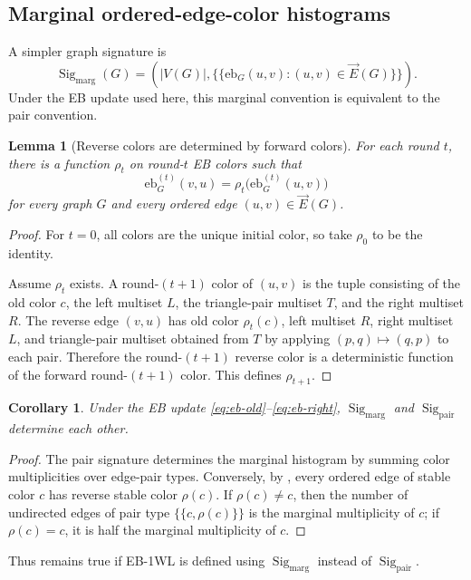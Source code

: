 \documentclass[11pt]{article}
\newtheorem{lemma}[theorem]{Lemma}
\newtheorem{corollary}[theorem]{Corollary}
\DeclareMathOperator{\Sig}{Sig}
\newcommand{\vecE}{\overrightarrow{E}}
\newcommand{\mset}[1]{\{\!\{#1\}\!\}}
\begin{document}
\subsection{Marginal ordered-edge-color histograms}

A simpler graph signature is
\[
\Sig_{\mathrm{marg}}(G)
=
\left(|V(G)|,\mset{\mathrm{eb}_G(u,v):(u,v)\in\vecE(G)}\right).
\]
Under the EB update used here, this marginal convention is equivalent to the pair convention.

\begin{lemma}[Reverse colors are determined by forward colors]
\label{lem:reverse-map}
For each round $t$, there is a function $\rho_t$ on round-$t$ EB colors such that
\[
\mathrm{eb}^{(t)}_G(v,u)=\rho_t\bigl(\mathrm{eb}^{(t)}_G(u,v)\bigr)
\]
for every graph $G$ and every ordered edge $(u,v)\in\vecE(G)$.
\end{lemma}

\begin{proof}
For $t=0$, all colors are the unique initial color, so take $\rho_0$ to be the identity.

Assume $\rho_t$ exists.  A round-$(t+1)$ color of $(u,v)$ is the tuple consisting of the old color $c$, the left multiset $L$, the triangle-pair multiset $T$, and the right multiset $R$.  The reverse edge $(v,u)$ has old color $\rho_t(c)$, left multiset $R$, right multiset $L$, and triangle-pair multiset obtained from $T$ by applying $(p,q)\mapsto(q,p)$ to each pair.  Therefore the round-$(t+1)$ reverse color is a deterministic function of the forward round-$(t+1)$ color.  This defines $\rho_{t+1}$.
\end{proof}

\begin{corollary}
Under the EB update \eqref{eq:eb-old}--\eqref{eq:eb-right}, $\Sig_{\mathrm{marg}}$ and $\Sig_{\mathrm{pair}}$ determine each other.
\end{corollary}

\begin{proof}
The pair signature determines the marginal histogram by summing color multiplicities over edge-pair types.  Conversely, by , every ordered edge of stable color $c$ has reverse stable color $\rho(c)$.  If $\rho(c)\neq c$, then the number of undirected edges of pair type $\mset{c,\rho(c)}$ is the marginal multiplicity of $c$; if $\rho(c)=c$, it is half the marginal multiplicity of $c$.
\end{proof}

Thus  remains true if EB-1WL is defined using $\Sig_{\mathrm{marg}}$ instead of $\Sig_{\mathrm{pair}}$.
\end{document}
